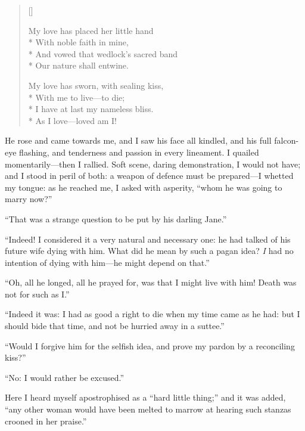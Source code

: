 \begin{verse}[\versewidth]
{My love has placed her little hand\\*
\hspace*{0.333em}\hspace*{0.333em} With noble faith in mine,\\*
And vowed that wedlock's sacred band\\*
\hspace*{0.333em}\hspace*{0.333em} Our nature shall entwine.

My love has sworn, with sealing kiss,\\*
\hspace*{0.333em}\hspace*{0.333em} With me to live---to die;\\*
I have at last my nameless bliss.\\*
\hspace*{0.333em}\hspace*{0.333em} As I love---loved am I!}
\end{verse}

He rose and came towards me, and I saw his face all kindled, and his
full falcon-eye flashing, and tenderness and passion in every
lineament.  I quailed momentarily---then I rallied.  Soft scene, daring
demonstration, I would not have; and I stood in peril of both: a weapon
of defence must be prepared---I whetted my tongue: as he reached me, I
asked with asperity, \enquote{whom he was going to marry now?}

\enquote{That was a strange question to be put by his darling Jane.}

\enquote{Indeed!  I considered it a very natural and necessary one: he had
talked of his future wife dying with him.  What did he mean by such a
pagan idea?  \emph{I} had no intention of dying with him---he might
depend on that.}

\enquote{Oh, all he longed, all he prayed for, was that I might live
with him!  Death was not for such as I\@.}

\enquote{Indeed it was: I had as good a right to die when my time came
as he had: but I should bide that time, and not be hurried away in a
suttee.}

\enquote{Would I forgive him for the selfish idea, and prove my pardon
by a reconciling kiss?}

\enquote{No: I would rather be excused.}

Here I heard myself apostrophised as a \enquote{hard little thing;} and
it was added, \enquote{any other woman would have been melted to marrow
at hearing such stanzas crooned in her praise.}

